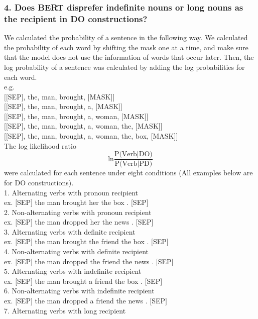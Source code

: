 \documentclass[twocolumn,dvipdfmx, 10pt]{article}
\begin{document}
\subsubsection*{4. Does BERT disprefer indefinite nouns or long nouns as the recipient in DO constructions?}
We calculated the probability of a sentence in the following way.  We calculated the probability of each word by shifting the mask one at a time, and make sure that the model does not use the information of words that occur later.  Then, the log probability of a sentence was calculated by adding the log probabilities for each word.\\
e.g.\\
$[[$SEP$]$, the, man, brought, $[$MASK$]]$\\
$[[$SEP$]$, the, man, brought, a, $[$MASK$]]$\\
$[[$SEP$]$, the, man, brought, a, woman, $[$MASK$]]$\\
$[[$SEP$]$, the, man, brought, a, woman, the, $[$MASK$]]$\\
$[[$SEP$]$, the, man, brought, a, woman, the, box, $[$MASK$]]$\\
The log likelihood ratio
$$\text{ln}\frac{\text{P(Verb} | \text{DO)}}{\text{P(Verb} | \text{PD)}}$$
were calculated for each sentence under eight conditions (All examples below are for DO constructions).\\
1. Alternating verbs with pronoun recipient\\
ex. $[$SEP$]$ the man brought her the box . $[$SEP$]$\\
2. Non-alternating verbs with pronoun recipient\\
ex. $[$SEP$]$ the man dropped her the news . $[$SEP$]$\\
3. Alternating verbs with definite recipient\\
ex. $[$SEP$]$ the man brought the friend the box . $[$SEP$]$\\
4. Non-alternating verbs with definite recipient\\
ex. $[$SEP$]$ the man dropped the friend the news . $[$SEP$]$\\
5. Alternating verbs with indefinite recipient\\
ex. $[$SEP$]$ the man brought a friend the box . $[$SEP$]$\\
6. Non-alternating verbs with indefinite recipient\\
ex. $[$SEP$]$ the man dropped a friend the news . $[$SEP$]$\\
7. Alternating verbs with long recipient\\
\end{document}
